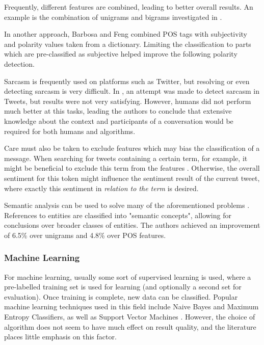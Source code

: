 \documentclass{sig-alternate}
\begin{document}
Frequently, different features are combined, leading to better overall results. An example is the combination of unigrams and bigrams investigated in \cite{go2009twitter}.

In another approach, Barbosa and Feng \cite{barbosa2010robust} combined POS tags with subjectivity and polarity values taken from a dictionary. Limiting the classification to parts which are pre-classified as subjective helped improve the following polarity detection.

\medskip

Sarcasm is frequently used on platforms such as Twitter, but resolving or even detecting sarcasm is very difficult. In \cite{gonzalez2011identifying}, an attempt was made to detect sarcasm in Tweets, but results were not very satisfying. However, humans did not perform much better at this tasks, leading the authors to conclude that extensive knowledge about the context  and participants of a conversation would be required for both humans and algorithms.

Care must also be taken to exclude features which may bias the classification of a message. When searching for tweets containing a certain term, for example, it might be beneficial to exclude this term from the features \cite{go2009twitter}. Otherwise, the overall sentiment for this token might influence the sentiment result of the current tweet, where exactly this sentiment in \textit{relation to the term} is desired.

Semantic analysis can be used to solve many of the aforementioned problems \cite{saif2012semantic}. References to entities are classified into "semantic concepts", allowing for conclusions over broader classes of entities. The authors achieved an improvement of 6.5\% over unigrams and 4.8\% over POS features.

\subsubsection{Machine Learning}

For machine learning, usually some sort of supervised learning is used, where a pre-labelled training set is used for learning (and optionally a second set for evaluation). Once training is complete, new data can be classified. Popular machine learning techniques used in this field include Naive Bayes and Maximum Entropy Classifiers, as well as Support Vector Machines \cite{vinodhini2012sentiment}. However, the choice of algorithm does not seem to have much effect on result quality, and the literature places little emphasis on this factor.
\end{document}
